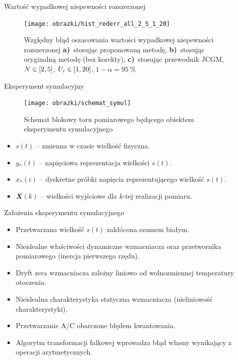 \documentclass[12pt, polish, aspectratio = 169]{slides}
\begin{document}
\begin{frame}{Wartość wypadkowej niepewności rozszerzonej}
\begin{figure}
\texttt{[image: obrazki/hist\_rederr\_all\_2\_5\_1\_20]}
\caption{Względny błąd oszacowania wartości wypadkowej niepewności rozszerzonej \textbf{a)}~stosując proponowaną metodę, \textbf{b)}~stosując oryginalną metodę (bez korekty), \textbf{c)}~stosując przewodnik JCGM, $N \in \interval{2}{5}$, $U_{i} \in \interval{1}{20}$, $1-\alpha = \qty{95}{\percent}$}
\end{figure}
\end{frame}

\begin{frame}{Eksperyment symulacyjny}
\begin{figure}
\texttt{[image: obrazki/schemat\_symul]}
\caption{Schemat blokowy toru pomiarowego będącego obiektem eksperymentu symulacyjnego}
\end{figure}
\begin{itemize}
\item $s(t)$ -- zmienna w czasie wielkość fizyczna.
\item $y_{*}(t)$ -- napięciowa reprezentacja wielkości $s(t)$.
\item $x_{*}(i)$ -- dyskretne próbki napięcia reprezentującego wielkość $s(t)$.
\item $\mathbfit{X}(k)$ -- wielkości wyjściowe dla $k$-tej realizacji pomiaru.
\end{itemize}
\end{frame}

\begin{frame}{Założenia eksperymentu symulacyjnego}
\begin{itemize}
\item Przetwarzana wielkość $s(t)$ zakłócona szumem białym.
\item Nieidealne właściwości dynamiczne wzmacniacza oraz przetwornika pomiarowego (inercja pierwszego rzędu).
\item Dryft zera wzmacniacza zależny liniowo od wolnozmiennej temperatury otoczenia.
\item Nieidealna charakterystyka statyczna wzmacniacza (nieliniowość charakterystyki).
\item Przetwarzanie A/C obarczone błędem kwantowania.
\item Algorytm transformacji falkowej wprowadza błąd własny wynikający z operacji arytmetycznych.
\end{itemize}
\end{frame}
\end{document}
